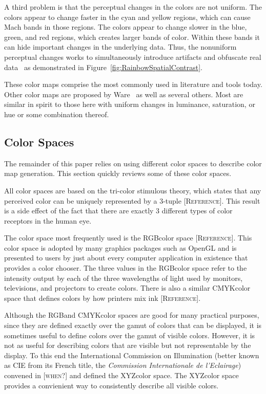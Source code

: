 \documentclass[twocolumn]{article}
\newcommand{\lcite}[1]{~\cite{#1}}
\newcommand{\scite}[1]{~\cite{#1}}
\newcommand{\sticky}[1]{\textsc{[#1]}}
\newcommand{\RGB}{RGB}
\newcommand{\CMYK}{CMYK}
\newcommand{\XYZ}{XYZ}
\begin{document}
A third problem is that the perceptual changes in the colors are not
uniform.  The colors appear to change faster in the cyan and yellow
regions, which can cause Mach bands in those regions.  The colors appear to
change slower in the blue, green, and red regions, which creates larger
bands of color.  Within these bands it can hide important changes in the
underlying data.  Thus, the nonuniform perceptual changes works to
simultaneously introduce artifacts and obfuscate real
data\lcite{Borland07} as demonstrated in
Figure~\ref{fig:RainbowSpatialContrast}.

These color maps comprise the most commonly used in literature and tools
today.  Other color maps are proposed by Ware\scite{Ware04} as well as
several others.  Most are similar in spirit to those here with uniform
changes in luminance, saturation, or hue or some combination thereof.

\subsection{Color Spaces}
\label{sec:PreviousWork:ColorSpaces}

The remainder of this paper relies on using different color spaces to
describe color map generation.  This section quickly reviews some of these
color spaces.

All color spaces are based on the tri-color stimulous theory, which states
that any perceived color can be uniquely represented by a 3-tuple
\sticky{Reference}.  This result is a side effect of the fact that there
are exactly 3 different types of color receptors in the human eye.

The color space most frequently used is the \RGB color space
\sticky{Reference}.  This color space is adopted by many graphics packages
such as OpenGL and is presented to users by just about every computer
application in existence that provides a color chooser.  The three values
in the \RGB color space refer to the intensity output by each of the three
wavelengths of light used by monitors, televisions, and projectors to
create colors.  There is also a similar \CMYK color space that defines
colors by how printers mix ink \sticky{Reference}.

Although the \RGB and \CMYK color spaces are good for many practical
purposes, since they are defined exactly over the gamut of colors that can
be displayed, it is sometimes useful to define colors over the gamut of
visible colors.  However, it is not as useful for describing colors that
are visible but not representable by the display.  To this end the
International Commission on Illumination (better known as CIE from its
French title, the \emph{Commission Internationale de l'Eclairage}) convened
in \sticky{when?} and defined the \XYZ color space.  The \XYZ color space
provides a convienient way to consistently describe all visible colors.
\end{document}

